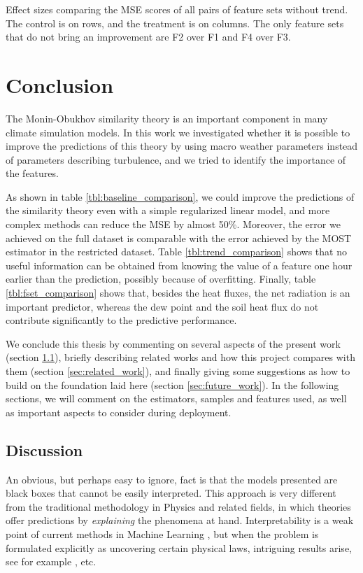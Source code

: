 \documentclass[a4paper,11pt]{kth-mag}
\begin{document}
\begin{table}
\caption{Effect sizes comparing the MSE scores of all pairs of feature sets without trend. The control is on rows, and the treatment is on columns. The only feature sets that do not bring an improvement are F2 over F1 and F4 over F3.}
\label{tbl:fset_comparison}

\end{table}


\chapter{Conclusion}
\label{ch:conclusion}
The Monin-Obukhov similarity theory is an important component in many climate simulation models. In this work we investigated whether it is possible to improve the predictions of this theory by using macro weather parameters instead of parameters describing turbulence, and we tried to identify the importance of the features.

As shown in table \ref{tbl:baseline_comparison}, we could improve the predictions of the similarity theory even with a simple regularized linear model, and more complex methods can reduce the MSE by almost 50\%. Moreover, the error we achieved on the full dataset is comparable with the error achieved by the MOST estimator in the restricted dataset. Table \ref{tbl:trend_comparison} shows that no useful information can be obtained from knowing the value of a feature one hour earlier than the prediction, possibly because of overfitting. Finally, table \ref{tbl:fset_comparison} shows that, besides the heat fluxes, the net radiation is an important predictor, whereas the dew point and the soil heat flux do not contribute significantly to the predictive performance.

We conclude this thesis by commenting on several aspects of the present work (section \ref{sec:discussion}), briefly describing related works and how this project compares with them (section \ref{sec:related_work}), and finally giving some suggestions as how to build on the foundation laid here (section \ref{sec:future_work}). In the following sections, we will comment on the estimators, samples and features used, as well as important aspects to consider during deployment.

\section{Discussion}
\label{sec:discussion}
An obvious, but perhaps easy to ignore, fact is that the models presented are black boxes that cannot be easily interpreted. This approach is very different from the traditional methodology in Physics and related fields, in which theories offer predictions by \emph{explaining} the phenomena at hand. Interpretability is a weak point of current methods in Machine Learning \citep{interpret_ml}, but when the problem is formulated explicitly as uncovering certain physical laws, intriguing results arise, see for example \cite{ml_diff_eq}, \cite{learn_eqs} etc.
\end{document}
